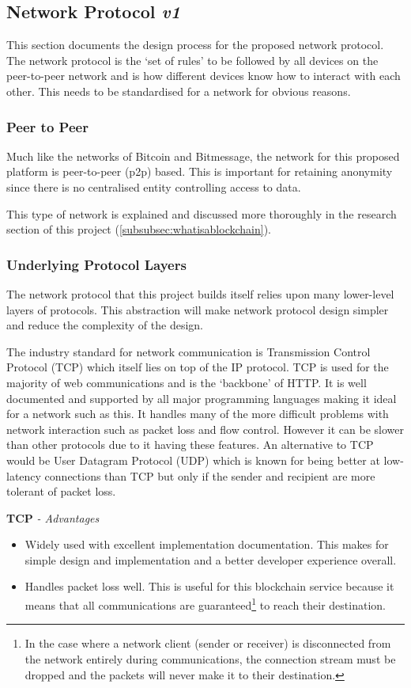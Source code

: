 \documentclass{article}
\begin{document}
\newpage
\subsection{Network Protocol \textit{v1}}
This section documents the design process for the proposed network protocol. The network protocol is the `set of rules' to be followed by all devices on the peer-to-peer network and is how different devices know how to interact with each other. This needs to be standardised for a network for obvious reasons.

\subsubsection{Peer to Peer}
Much like the networks of Bitcoin and Bitmessage, the network for this proposed platform is peer-to-peer (p2p) based. This is important for retaining anonymity since there is no centralised entity controlling access to data.

This type of network is explained and discussed more thoroughly in the research section of this project (\autoref{subsubsec:whatisablockchain}).

\subsubsection{Underlying Protocol Layers}
The network protocol that this project builds itself relies upon many lower-level layers of protocols. This abstraction will make network protocol design simpler and reduce the complexity of the design.

The industry standard for network communication is Transmission Control Protocol (TCP) which itself lies on top of the IP protocol. TCP is used for the majority of web communications and is the `backbone' of HTTP. It is well documented and supported by all major programming languages making it ideal for a network such as this. It handles many of the more difficult problems with network interaction such as packet loss and flow control. However it can be slower than other protocols due to it having these features. An alternative to TCP would be User Datagram Protocol (UDP) which is known for being better at low-latency connections than TCP but only if the sender and recipient are more tolerant of packet loss.

\newpage

\textbf{TCP}
\textit{ - Advantages}
\begin{itemize}
    \item Widely used with excellent implementation documentation. This makes for simple design and implementation and a better developer experience overall.
    \item Handles packet loss well. This is useful for this blockchain service because it means that all communications are guaranteed\footnote{In the case where a network client (sender or receiver) is disconnected from the network entirely during communications, the connection stream must be dropped and the packets will never make it to their destination.} to reach their destination.
\end{itemize}
\end{document}
